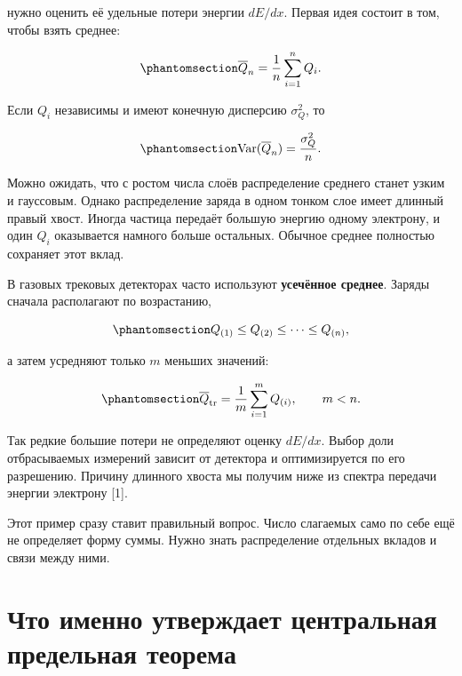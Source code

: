 \documentclass[
  russian,
  11pt,
  a4paper,
  open=any]{scrbook}
\begin{document}
нужно оценить её удельные потери энергии \(dE/dx\). Первая идея состоит
в том, чтобы взять среднее:

\begin{equation}\protect\phantomsection\label{eq-tracker-ordinary-mean}{
\overline Q_n=\frac1n\sum_{i=1}^{n}Q_i.
}\end{equation}

Если \(Q_i\) независимы и имеют конечную дисперсию \(\sigma_Q^2\), то

\begin{equation}\protect\phantomsection\label{eq-tracker-mean-variance}{
\operatorname{Var}(\overline Q_n)=\frac{\sigma_Q^2}{n}.
}\end{equation}

Можно ожидать, что с ростом числа слоёв распределение среднего станет
узким и гауссовым. Однако распределение заряда в одном тонком слое имеет
длинный правый хвост. Иногда частица передаёт большую энергию одному
электрону, и один \(Q_i\) оказывается намного больше остальных. Обычное
среднее полностью сохраняет этот вклад.

В газовых трековых детекторах часто используют \textbf{усечённое
среднее}. Заряды сначала располагают по возрастанию,

\begin{equation}\protect\phantomsection\label{eq-tracker-ordered-charges}{
Q_{(1)}\le Q_{(2)}\le\cdots\le Q_{(n)},
}\end{equation}

а затем усредняют только \(m\) меньших значений:

\begin{equation}\protect\phantomsection\label{eq-tracker-truncated-mean}{
\overline Q_{\mathrm{tr}}
=\frac1m\sum_{i=1}^{m}Q_{(i)},
\qquad m<n.
}\end{equation}

Так редкие большие потери не определяют оценку \(dE/dx\). Выбор доли
отбрасываемых измерений зависит от детектора и оптимизируется по его
разрешению. Причину длинного хвоста мы получим ниже из спектра передачи
энергии электрону {[}1{]}.

Этот пример сразу ставит правильный вопрос. Число слагаемых само по себе
ещё не определяет форму суммы. Нужно знать распределение отдельных
вкладов и связи между ними.

\section{Что именно утверждает центральная предельная
теорема}\label{ux447ux442ux43e-ux438ux43cux435ux43dux43dux43e-ux443ux442ux432ux435ux440ux436ux434ux430ux435ux442-ux446ux435ux43dux442ux440ux430ux43bux44cux43dux430ux44f-ux43fux440ux435ux434ux435ux43bux44cux43dux430ux44f-ux442ux435ux43eux440ux435ux43cux430}
\end{document}
